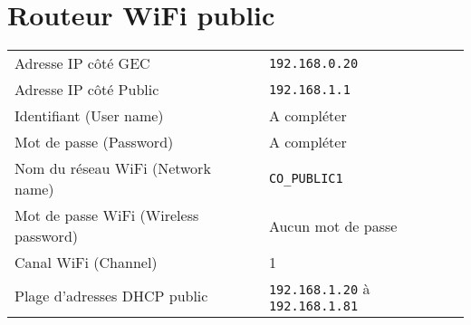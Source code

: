 \documentclass[a4paper]{ffco-rapport}
\begin{document}
\section*{Routeur WiFi public}

\begin{tabular}{l|l}
	Adresse IP côté GEC & \texttt{192.168.0.20}\\
	Adresse IP côté Public & \texttt{192.168.1.1}\\
	Identifiant (User name) & A compléter\\
	Mot de passe (Password) & A compléter\\
	Nom du réseau WiFi (Network name) & \texttt{CO\_PUBLIC1}\\
	Mot de passe WiFi (Wireless password) & Aucun mot de passe\\ 
	Canal WiFi (Channel) & 1\\
	Plage d'adresses DHCP public & \texttt{192.168.1.20} à \texttt{192.168.1.81}\\
\end{tabular}

	
\end{document}
